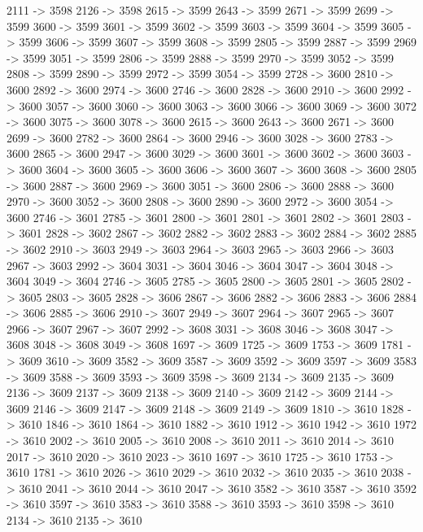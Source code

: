{	2111 -> 3598
	2126 -> 3598
	2615 -> 3599
	2643 -> 3599
	2671 -> 3599
	2699 -> 3599
	3600 -> 3599
	3601 -> 3599
	3602 -> 3599
	3603 -> 3599
	3604 -> 3599
	3605 -> 3599
	3606 -> 3599
	3607 -> 3599
	3608 -> 3599
	2805 -> 3599
	2887 -> 3599
	2969 -> 3599
	3051 -> 3599
	2806 -> 3599
	2888 -> 3599
	2970 -> 3599
	3052 -> 3599
	2808 -> 3599
	2890 -> 3599
	2972 -> 3599
	3054 -> 3599
	2728 -> 3600
	2810 -> 3600
	2892 -> 3600
	2974 -> 3600
	2746 -> 3600
	2828 -> 3600
	2910 -> 3600
	2992 -> 3600
	3057 -> 3600
	3060 -> 3600
	3063 -> 3600
	3066 -> 3600
	3069 -> 3600
	3072 -> 3600
	3075 -> 3600
	3078 -> 3600
	2615 -> 3600
	2643 -> 3600
	2671 -> 3600
	2699 -> 3600
	2782 -> 3600
	2864 -> 3600
	2946 -> 3600
	3028 -> 3600
	2783 -> 3600
	2865 -> 3600
	2947 -> 3600
	3029 -> 3600
	3601 -> 3600
	3602 -> 3600
	3603 -> 3600
	3604 -> 3600
	3605 -> 3600
	3606 -> 3600
	3607 -> 3600
	3608 -> 3600
	2805 -> 3600
	2887 -> 3600
	2969 -> 3600
	3051 -> 3600
	2806 -> 3600
	2888 -> 3600
	2970 -> 3600
	3052 -> 3600
	2808 -> 3600
	2890 -> 3600
	2972 -> 3600
	3054 -> 3600
	2746 -> 3601
	2785 -> 3601
	2800 -> 3601
	2801 -> 3601
	2802 -> 3601
	2803 -> 3601
	2828 -> 3602
	2867 -> 3602
	2882 -> 3602
	2883 -> 3602
	2884 -> 3602
	2885 -> 3602
	2910 -> 3603
	2949 -> 3603
	2964 -> 3603
	2965 -> 3603
	2966 -> 3603
	2967 -> 3603
	2992 -> 3604
	3031 -> 3604
	3046 -> 3604
	3047 -> 3604
	3048 -> 3604
	3049 -> 3604
	2746 -> 3605
	2785 -> 3605
	2800 -> 3605
	2801 -> 3605
	2802 -> 3605
	2803 -> 3605
	2828 -> 3606
	2867 -> 3606
	2882 -> 3606
	2883 -> 3606
	2884 -> 3606
	2885 -> 3606
	2910 -> 3607
	2949 -> 3607
	2964 -> 3607
	2965 -> 3607
	2966 -> 3607
	2967 -> 3607
	2992 -> 3608
	3031 -> 3608
	3046 -> 3608
	3047 -> 3608
	3048 -> 3608
	3049 -> 3608
	1697 -> 3609
	1725 -> 3609
	1753 -> 3609
	1781 -> 3609
	3610 -> 3609
	3582 -> 3609
	3587 -> 3609
	3592 -> 3609
	3597 -> 3609
	3583 -> 3609
	3588 -> 3609
	3593 -> 3609
	3598 -> 3609
	2134 -> 3609
	2135 -> 3609
	2136 -> 3609
	2137 -> 3609
	2138 -> 3609
	2140 -> 3609
	2142 -> 3609
	2144 -> 3609
	2146 -> 3609
	2147 -> 3609
	2148 -> 3609
	2149 -> 3609
	1810 -> 3610
	1828 -> 3610
	1846 -> 3610
	1864 -> 3610
	1882 -> 3610
	1912 -> 3610
	1942 -> 3610
	1972 -> 3610
	2002 -> 3610
	2005 -> 3610
	2008 -> 3610
	2011 -> 3610
	2014 -> 3610
	2017 -> 3610
	2020 -> 3610
	2023 -> 3610
	1697 -> 3610
	1725 -> 3610
	1753 -> 3610
	1781 -> 3610
	2026 -> 3610
	2029 -> 3610
	2032 -> 3610
	2035 -> 3610
	2038 -> 3610
	2041 -> 3610
	2044 -> 3610
	2047 -> 3610
	3582 -> 3610
	3587 -> 3610
	3592 -> 3610
	3597 -> 3610
	3583 -> 3610
	3588 -> 3610
	3593 -> 3610
	3598 -> 3610
	2134 -> 3610
	2135 -> 3610
}
